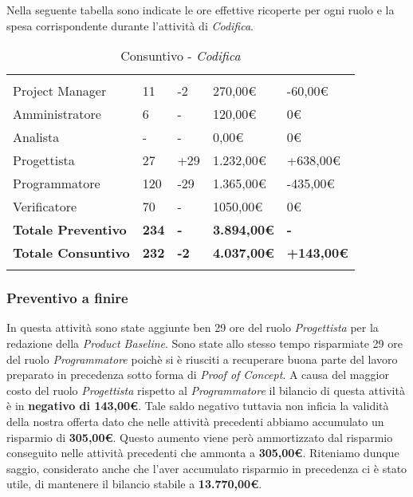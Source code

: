 Nella seguente tabella sono indicate le ore effettive ricoperte per ogni ruolo e la spesa corrispondente durante l'attività di \textit{Codifica}.

\label{sec:tabellaConsuntivoPA}
\begin{table}[H]
	\centering
	\begin{tabular}{|p{3.8cm}|C{2.6cm}|C{2.9cm}|C{2.7cm}|C{3.3cm}|}
		
		 & & & & \\
		Project Manager & 11 & -2 & 270,00\euro & -60,00\euro \\
		\hline
		Amministratore & 6 & - & 120,00\euro & 0\euro \\
		\hline
		Analista      & - & - & 0,00\euro & 0\euro \\
		\hline
		Progettista   & 27  & +29 & 1.232,00\euro & +638,00\euro \\
		\hline
		Programmatore & 120 & -29 & 1.365,00\euro & -435,00\euro \\
		\hline
		Verificatore  & 70 & - & 1050,00\euro & 0\euro \\
		\textbf{Totale Preventivo} & \textbf{234} & \textbf{-} & \textbf{3.894,00\euro} & \textbf{-}\\
		\textbf{Totale Consuntivo} & \textbf{232} & \textbf{-2} & \textbf{4.037,00\euro} & \textbf{+143,00\euro}\\
	\end{tabular}
	\caption{Consuntivo - \textit{Codifica}}
	
\end{table}

\subsubsection{Preventivo a finire}
In questa attività sono state aggiunte ben 29 ore del ruolo \textit{Progettista} per la redazione della \textit{Product Baseline}. Sono state allo stesso tempo risparmiate 29 ore del ruolo \textit{Programmatore} poichè si è riusciti a recuperare buona parte del lavoro preparato in precedenza sotto forma di \textit{Proof of Concept}. A causa del maggior costo del ruolo \textit{Progettista} rispetto al \textit{Programmatore} il bilancio di questa attività è in \textbf{negativo di 143,00\euro}. Tale saldo negativo tuttavia non inficia la validità della nostra offerta dato che nelle attività precedenti abbiamo accumulato un risparmio di \textbf{305,00\euro}. 
Questo aumento viene però ammortizzato dal risparmio conseguito nelle attività precedenti che ammonta a \textbf{305,00\euro}. Riteniamo dunque saggio, considerato anche che l'aver accumulato risparmio in precedenza ci è stato utile, di mantenere il bilancio stabile a \textbf{13.770,00\euro}.



